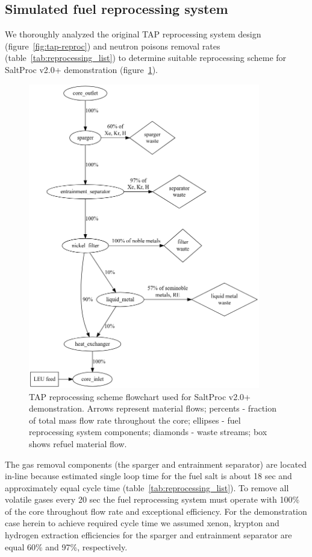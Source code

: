 \documentclass[12pt]{article} %
\begin{document}
\subsection{Simulated fuel reprocessing system}
We thoroughly analyzed the original \gls{TAP} reprocessing system design 
(figure~\ref{fig:tap-reproc}) and neutron poisons removal rates 
(table~\ref{tab:reprocessing_list}) to determine suitable reprocessing 
scheme for SaltProc v2.0+ demonstration (figure~\ref{fig:demo-repro-scheme}).
\begin{figure}[htp!] %
  \centering
		  \includegraphics[width=0.9\textwidth]{demo_reprocessing_scheme.png}
  \caption{\gls{TAP} reprocessing scheme flowchart used for SaltProc v2.0+ 
  demonstration. Arrows represent material flows; percents - fraction of total 
  mass flow rate throughout the core; ellipses - fuel reprocessing system 
  components; diamonds - waste streams; box shows refuel material flow.}
  \label{fig:demo-repro-scheme}
\end{figure}

The gas removal components (the sparger and entrainment separator) are located 
in-line because estimated single loop time for the fuel salt is about 
18 sec and approximately equal cycle time (table~\ref{tab:reprocessing_list}). 
To remove all volatile gases every 20 sec the fuel reprocessing system must 
operate with 100\% of the core throughout flow rate and exceptional efficiency. 
For the demonstration case herein to achieve required cycle time we assumed 
xenon, krypton and hydrogen extraction efficiencies for the sparger and 
entrainment separator are equal 60\% and 97\%, respectively.
\end{document}
